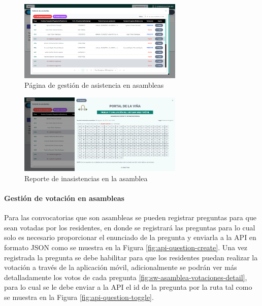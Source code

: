 \begin{figure}[H]
    \centering
    \includegraphics[width=0.7\textwidth]{resources/images/sw-asamblea-asistencia}
    \caption{Página de gestión de asistencia en asambleas}
    \label{fig:sw-asamblea-asistencia}
\end{figure}

\begin{figure}[H]
    \centering
    \includegraphics[width=0.7\textwidth]{resources/images/sw-asamblea-asistencia-reporte}
    \caption{Reporte de inasistencias en la asamblea}
    \label{fig:sw-asamblea-asistencia-reporte}
\end{figure}

\paragraph{Gestión de votación en asambleas}

Para las convocatorias que son asambleas se pueden registrar preguntas para que sean votadas por los residentes, en donde se registrará las preguntas para lo cual solo es necesario proporcionar el enunciado de la pregunta y enviarla a la API en formato JSON como se muestra en la Figura \ref{fig:api-question-create}.
Una vez registrada la pregunta se debe habilitar para que los residentes puedan realizar la votación a través de la aplicación móvil, adicionalmente se podrán ver más detalladamente los votos de cada pregunta \ref{fig:sw-asamblea-votaciones-detail}, para lo cual se le debe enviar a la API el id de la pregunta por la ruta tal como se muestra en la Figura \ref{fig:api-question-toggle}.


